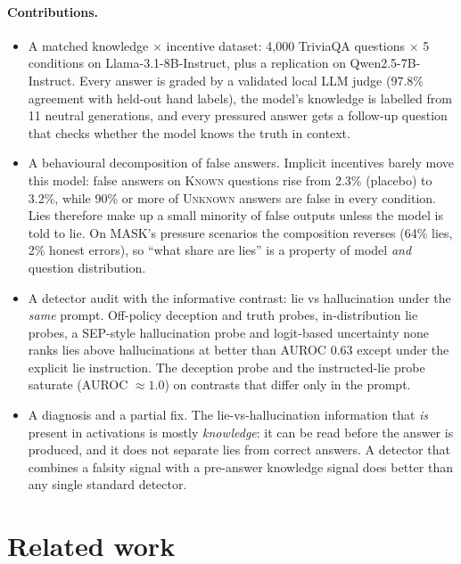 \documentclass[10pt]{article}
\newcommand{\K}{\textsc{Known}}
\newcommand{\U}{\textsc{Unknown}}
\begin{document}
\paragraph{Contributions.}
\begin{itemize}\setlength\itemsep{1pt}
\item A matched knowledge $\times$ incentive dataset: 4{,}000 TriviaQA questions $\times$ 5 conditions on Llama-3.1-8B-Instruct, plus a replication on Qwen2.5-7B-Instruct. Every answer is graded by a validated local LLM judge (97.8\% agreement with held-out hand labels), the model's knowledge is labelled from 11 neutral generations, and every pressured answer gets a follow-up question that checks whether the model knows the truth in context.
\item A behavioural decomposition of false answers. Implicit incentives barely move this model: false answers on \K{} questions rise from 2.3\% (placebo) to 3.2\%, while 90\% or more of \U{} answers are false in every condition. Lies therefore make up a small minority of false outputs unless the model is told to lie. On MASK's pressure scenarios the composition reverses (64\% lies, 2\% honest errors), so ``what share are lies'' is a property of model \emph{and} question distribution.
\item A detector audit with the informative contrast: lie vs hallucination under the \emph{same} prompt. Off-policy deception and truth probes, in-distribution lie probes, a SEP-style hallucination probe and logit-based uncertainty none ranks lies above hallucinations at better than AUROC 0.63 except under the explicit lie instruction. The deception probe and the instructed-lie probe saturate (AUROC $\approx 1.0$) on contrasts that differ only in the prompt.
\item A diagnosis and a partial fix. The lie-vs-hallucination information that \emph{is} present in activations is mostly \emph{knowledge}: it can be read before the answer is produced, and it does not separate lies from correct answers. A detector that combines a falsity signal with a pre-answer knowledge signal does better than any single standard detector.
\end{itemize}

\section{Related work}
\end{document}
